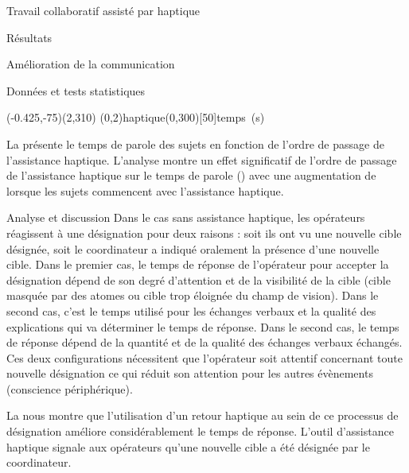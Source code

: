 \documentclass[myfrancais,ngerman,english,french]{mythesis}
\begin{document}
\begin{mychapter}{Travail collaboratif assisté par haptique}
\begin{mysection}{Résultats}
\begin{mysubsection}{Amélioration de la communication}
\begin{mysubsubsection}{Données et tests statistiques}
					\begin{myfigure}
						\begin{myps}(-0.425,-75)(2,310)
							\myaxes(0,2){haptique}(0,300)[50]{temps~(s)}
						\end{myps}
					\end{myfigure}

					La  présente le temps de parole des sujets  en fonction de l'ordre de passage de l'assistance haptique.
					L'analyse montre un effet significatif de l'ordre de passage de l'assistance haptique sur le temps de parole  () avec une augmentation de  lorsque les sujets commencent avec l'assistance haptique.
				\end{mysubsubsection}
				\begin{mysubsubsection}{Analyse et discussion}
					Dans le cas sans assistance haptique, les opérateurs réagissent à une désignation pour deux raisons : soit ils ont vu une nouvelle cible désignée, soit le coordinateur a indiqué oralement la présence d'une nouvelle cible.
					Dans le premier cas, le temps de réponse de l'opérateur pour accepter la désignation dépend de son degré d'attention et de la visibilité de la cible (cible masquée par des atomes ou cible trop éloignée du champ de vision).
					Dans le second cas, c'est le temps utilisé pour les échanges verbaux et la qualité des explications qui va déterminer le temps de réponse.
					Dans le second cas, le temps de réponse dépend de la quantité et de la qualité des échanges verbaux échangés.
					Ces deux configurations nécessitent que l'opérateur soit attentif concernant toute nouvelle désignation ce qui réduit son attention pour les autres évènements (conscience périphérique).

					La  nous montre que l'utilisation d'un retour haptique au sein de ce processus de désignation améliore considérablement le temps de réponse.
					L'outil d'assistance haptique signale aux opérateurs qu'une nouvelle cible a été désignée par le coordinateur.


\end{mysubsubsection}
\end{mysubsection}
\end{mysection}
\end{mychapter}
\end{document}
